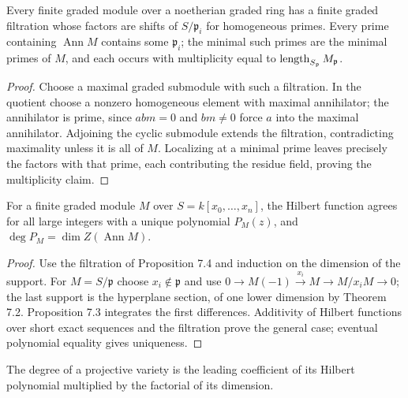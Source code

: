 \begin{proposition}
\label{prop:ha-ch1-7-4}
Every finite graded module over a noetherian graded ring has a finite graded filtration whose factors
are shifts of $S/\mathfrak p_i$ for homogeneous primes.  Every prime containing $\operatorname{Ann}M$
contains some $\mathfrak p_i$; the minimal such primes are the minimal primes of $M$, and each occurs
with multiplicity equal to $\operatorname{length}_{S_\mathfrak p}M_\mathfrak p$.
\end{proposition}
\begin{proof}
Choose a maximal graded submodule with such a filtration.  In the quotient choose a nonzero
homogeneous element with maximal annihilator; the annihilator is prime, since $abm=0$ and $bm\ne0$
force $a$ into the maximal annihilator.  Adjoining the cyclic submodule extends the filtration,
contradicting maximality unless it is all of $M$.  Localizing at a minimal prime leaves precisely
the factors with that prime, each contributing the residue field, proving the multiplicity claim.
\end{proof}

\begin{theorem}
\label{thm:ha-ch1-7-5}
For a finite graded module $M$ over $S=k[x_0,\ldots,x_n]$, the Hilbert function agrees for all
large integers with a unique polynomial $P_M(z)$, and \(\deg P_M=\dim Z(\operatorname{Ann}M)\).
\end{theorem}
\begin{proof}
Use the filtration of Proposition 7.4 and induction on the dimension of the support.  For
$M=S/\mathfrak p$ choose $x_i\notin\mathfrak p$ and use
$0\to M(-1)\xrightarrow{x_i}M\to M/x_iM\to0$; the last support is the hyperplane section,
of one lower dimension by Theorem 7.2.  Proposition 7.3 integrates the first differences.  Additivity
of Hilbert functions over short exact sequences and the filtration prove the general case; eventual
polynomial equality gives uniqueness.
\end{proof}

\begin{definition}[Degree]
\label{def:ha-ch1-degree}
The degree of a projective variety is the leading coefficient of its Hilbert polynomial multiplied
by the factorial of its dimension.
\end{definition}


